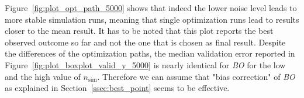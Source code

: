 \documentclass[bimj,fleqn]{w-art}
\theoremstyle{plain}
\theoremstyle{definition}
\begin{document}
Figure~\ref{fig:plot_opt_path_5000} shows that indeed the lower noise level leads to more stable simulation runs, meaning that single optimization runs lead to results closer to the mean result.
It has to be noted that this plot reports the best observed outcome so far and not the one that is chosen as final result.
Despite the differences of the optimization paths, the median validation error reported in Figure~\ref{fig:plot_boxplot_valid_y_5000} is nearly identical for \emph{BO} for the low and the high value of $n_\text{sim}$.
Therefore we can assume that "bias correction" of \emph{BO} as explained in Section~\ref{ssec:best_point} seems to be effective.
\end{document}
